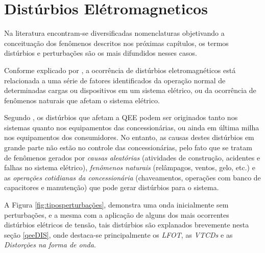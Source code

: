 \section{Distúrbios Elétromagneticos}\label{qeeDis}
\par 
Na literatura encontram-se diversificadas nomenclaturas objetivando a conceituação dos fenômenos descritos nos próximas capítulos, os termos distúrbios e perturbações são os mais difundidos nesses casos. 
\par 
Conforme explicado por \cite{FER99}, a ocorrência de distúrbios eletromagnéticos está relacionada a uma série de fatores identificados da operação normal de determinadas cargas ou dispositivos em um sistema elétrico, ou da ocorrência de fenômenos naturais que afetam o sistema elétrico.
\par 
Segundo \cite{JUN09}, os distúrbios que afetam a \ac{QEE} podem ser originados tanto nos sistemas quanto nos equipamentos das concessionárias, ou ainda em última milha nos equipamentos dos consumidores. No entanto, as causas destes distúrbios em grande parte não estão no controle das concessionárias, pelo fato que se tratam de fenômenos gerados por \emph{causas aleatórias} (atividades de construção, acidentes e falhas no sistema elétrico), \emph{fenômenos naturais} (relâmpagos, ventos, gelo, etc.) e as \emph{operações cotidianas da concessionária} (chaveamentos, operações com banco de capacitores e manutenção) que pode gerar distúrbios para o sistema.
\par 
A Figura \ref{fig:tiposperturbações}, demonstra uma onda inicialmente sem perturbações, e a mesma com a aplicação de alguns dos mais ocorrentes distúrbios elétricos de tensão, tais distúrbios são explanados brevemente nesta seção \ref{qeeDIS}, onde destaca-se principalmente os \emph{\ac{LFOT}}, as \emph{\ac{VTCDs}} e as \emph{Distorções na forma de onda}.


